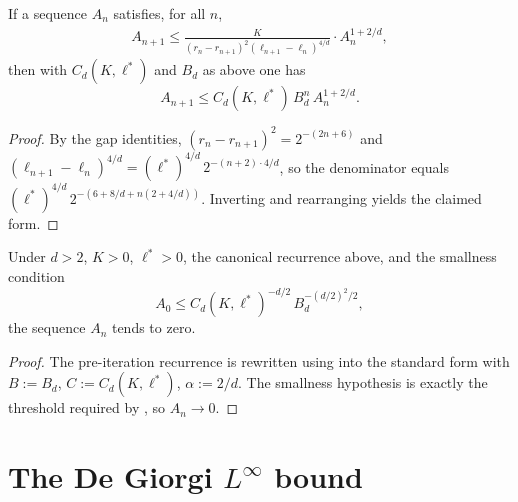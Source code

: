 \begin{theorem}
\label{thm:deGiorgi_preiter_to_recurrence}
\leanok
{}
If a sequence $A_n$ satisfies, for all $n$,
\begin{multline*}
  A_{n+1} \le
   \frac{K}{(r_n - r_{n+1})^2 (\ell_{n+1} - \ell_n)^{4/d}}
   \cdot A_n^{1 + 2/d},
\end{multline*}
then with $C_d(K,\ell^*)$ and $B_d$ as above one has
\begin{equation*}
  A_{n+1} \le C_d(K, \ell^*)\, B_d^n\, A_n^{1 + 2/d}.
\end{equation*}
\end{theorem}

\begin{proof}
\leanok
{}

By the gap identities,
$(r_n - r_{n+1})^2 = 2^{-(2n+6)}$ and
$(\ell_{n+1}-\ell_n)^{4/d} = (\ell^*)^{4/d}\, 2^{-(n+2)\cdot 4/d}$,
so the denominator equals
$(\ell^*)^{4/d}\, 2^{-(6+8/d + n(2+4/d))}$. Inverting and rearranging
yields the claimed form.
\end{proof}

\begin{theorem}
\label{thm:deGiorgi_preiter_vanishing}
\leanok
{}
Under $d > 2$, $K > 0$, $\ell^* > 0$, the canonical recurrence above,
and the smallness condition
\begin{equation*}
  A_0 \le C_d(K,\ell^*)^{-d/2}\, B_d^{-(d/2)^2 / 2},
\end{equation*}
the sequence $A_n$ tends to zero.
\end{theorem}

\begin{proof}
\leanok
{}

The pre-iteration recurrence is rewritten using
 into the standard form with
$B := B_d$, $C := C_d(K,\ell^*)$, $\alpha := 2/d$. The smallness
hypothesis is exactly the threshold required by
, so $A_n \to 0$.
\end{proof}

\section{The De Giorgi $L^\infty$ bound}


